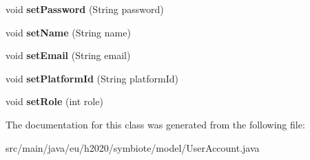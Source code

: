 \begin{DoxyCompactItemize}
\item 
void {\bfseries set\+Password} (String password)\hypertarget{classeu_1_1h2020_1_1symbiote_1_1model_1_1UserAccount_a1cbd7fcb25d5c70f3810c08022ae4af1}{}\label{classeu_1_1h2020_1_1symbiote_1_1model_1_1UserAccount_a1cbd7fcb25d5c70f3810c08022ae4af1}

\item 
void {\bfseries set\+Name} (String name)\hypertarget{classeu_1_1h2020_1_1symbiote_1_1model_1_1UserAccount_a0a8a5622b5a96d70173c052bdef6c384}{}\label{classeu_1_1h2020_1_1symbiote_1_1model_1_1UserAccount_a0a8a5622b5a96d70173c052bdef6c384}

\item 
void {\bfseries set\+Email} (String email)\hypertarget{classeu_1_1h2020_1_1symbiote_1_1model_1_1UserAccount_af8b138dad6ec59bc1e214a87b62e57cb}{}\label{classeu_1_1h2020_1_1symbiote_1_1model_1_1UserAccount_af8b138dad6ec59bc1e214a87b62e57cb}

\item 
void {\bfseries set\+Platform\+Id} (String platform\+Id)\hypertarget{classeu_1_1h2020_1_1symbiote_1_1model_1_1UserAccount_a5a657832c8c95e42ccda3c93be6f6d2d}{}\label{classeu_1_1h2020_1_1symbiote_1_1model_1_1UserAccount_a5a657832c8c95e42ccda3c93be6f6d2d}

\item 
void {\bfseries set\+Role} (int role)\hypertarget{classeu_1_1h2020_1_1symbiote_1_1model_1_1UserAccount_ac71db7e03875310cb2dbd3e0f1d985ac}{}\label{classeu_1_1h2020_1_1symbiote_1_1model_1_1UserAccount_ac71db7e03875310cb2dbd3e0f1d985ac}

\end{DoxyCompactItemize}


The documentation for this class was generated from the following file\+:\begin{DoxyCompactItemize}
\item 
src/main/java/eu/h2020/symbiote/model/User\+Account.\+java\end{DoxyCompactItemize}
